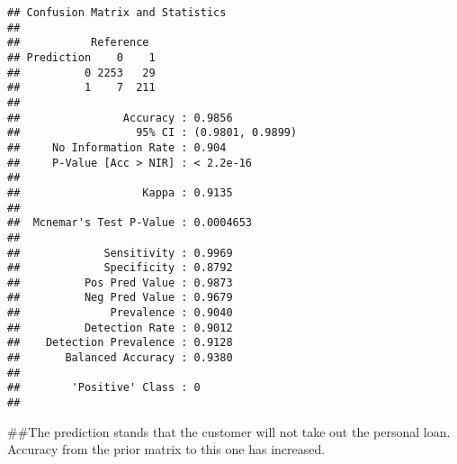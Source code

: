 \documentclass[
]{article}
\begin{document}
\begin{verbatim}
## Confusion Matrix and Statistics
## 
##           Reference
## Prediction    0    1
##          0 2253   29
##          1    7  211
##                                           
##                Accuracy : 0.9856          
##                  95% CI : (0.9801, 0.9899)
##     No Information Rate : 0.904           
##     P-Value [Acc > NIR] : < 2.2e-16       
##                                           
##                   Kappa : 0.9135          
##                                           
##  Mcnemar's Test P-Value : 0.0004653       
##                                           
##             Sensitivity : 0.9969          
##             Specificity : 0.8792          
##          Pos Pred Value : 0.9873          
##          Neg Pred Value : 0.9679          
##              Prevalence : 0.9040          
##          Detection Rate : 0.9012          
##    Detection Prevalence : 0.9128          
##       Balanced Accuracy : 0.9380          
##                                           
##        'Positive' Class : 0               
## 
\end{verbatim}

\#\#The prediction stands that the customer will not take out the
personal loan. Accuracy from the prior matrix to this one has increased.
\end{document}
